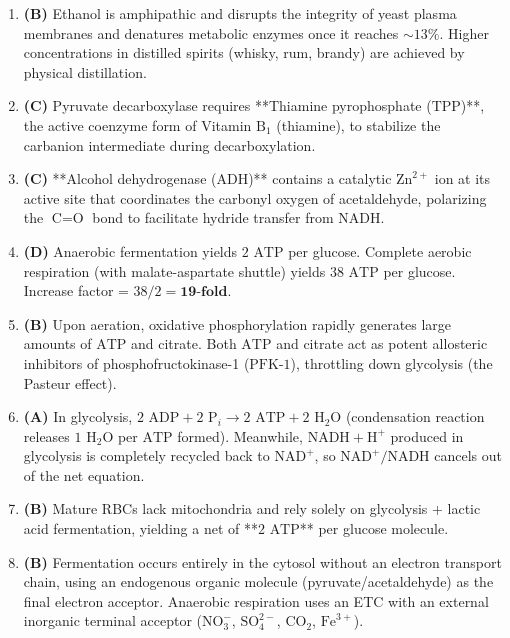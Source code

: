\documentclass[11pt, a4paper]{article}
\begin{document}
\begin{enumerate}[label=\textbf{\arabic*.}]
\item \textbf{(B)} Ethanol is amphipathic and disrupts the integrity of yeast plasma membranes and denatures metabolic enzymes once it reaches $\sim 13\%$. Higher concentrations in distilled spirits (whisky, rum, brandy) are achieved by physical distillation.

\item \textbf{(C)} Pyruvate decarboxylase requires **Thiamine pyrophosphate ($\text{TPP}$)**, the active coenzyme form of Vitamin $\text{B}_1$ (thiamine), to stabilize the carbanion intermediate during decarboxylation.

\item \textbf{(C)} **Alcohol dehydrogenase ($\text{ADH}$)** contains a catalytic $\text{Zn}^{2+}$ ion at its active site that coordinates the carbonyl oxygen of acetaldehyde, polarizing the $\text{C}=\text{O}$ bond to facilitate hydride transfer from $\text{NADH}$.

\item \textbf{(D)} Anaerobic fermentation yields $2\text{ ATP}$ per glucose. Complete aerobic respiration (with malate-aspartate shuttle) yields $38\text{ ATP}$ per glucose. Increase factor = $38 / 2 = \mathbf{19\text{-fold}}$.

\item \textbf{(B)} Upon aeration, oxidative phosphorylation rapidly generates large amounts of $\text{ATP}$ and citrate. Both $\text{ATP}$ and citrate act as potent allosteric inhibitors of phosphofructokinase-1 ($\text{PFK-1}$), throttling down glycolysis (the Pasteur effect).

\item \textbf{(A)} In glycolysis, $2\text{ ADP} + 2\text{ P}_i \rightarrow 2\text{ ATP} + 2\text{ H}_2\text{O}$ (condensation reaction releases $1\text{ H}_2\text{O}$ per $\text{ATP}$ formed). Meanwhile, $\text{NADH} + \text{H}^+$ produced in glycolysis is completely recycled back to $\text{NAD}^+$, so $\text{NAD}^+/\text{NADH}$ cancels out of the net equation.

\item \textbf{(B)} Mature RBCs lack mitochondria and rely solely on glycolysis + lactic acid fermentation, yielding a net of **$2\text{ ATP}$** per glucose molecule.

\item \textbf{(B)} Fermentation occurs entirely in the cytosol without an electron transport chain, using an endogenous organic molecule (pyruvate/acetaldehyde) as the final electron acceptor. Anaerobic respiration uses an ETC with an external inorganic terminal acceptor ($\text{NO}_3^-$, $\text{SO}_4^{2-}$, $\text{CO}_2$, $\text{Fe}^{3+}$).


\end{enumerate}
\end{document}
